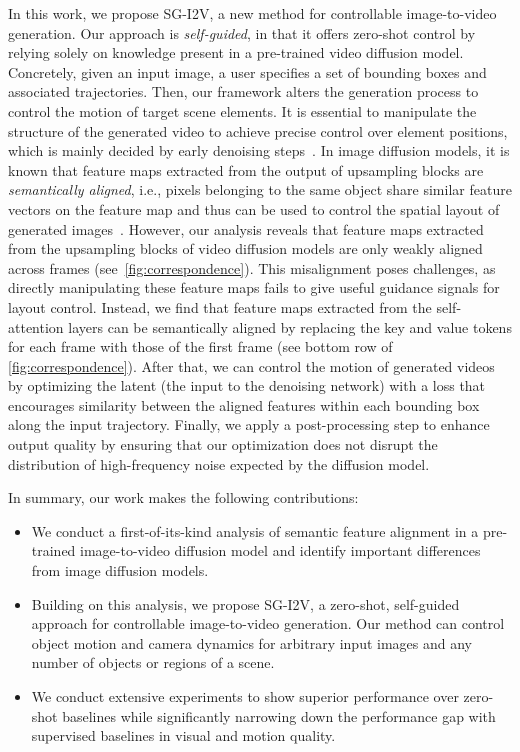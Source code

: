 \documentclass{article} \usepackage{iclr2025_conference,times}
\begin{document}
In this work, we propose SG-I2V, a new method for controllable image-to-video generation.
Our approach is \textit{self-guided}, in that it offers zero-shot control by relying solely on knowledge present in a pre-trained video diffusion model. 
Concretely, given an input image, a user specifies a set of bounding boxes and associated trajectories.
Then, our framework alters the generation process to control the motion of target scene elements.
It is essential to manipulate the structure of the
generated video to achieve precise control over element positions, which is mainly decided by early denoising steps~\citep{balaji2022ediff,DMProcessAnalyze}.
In image diffusion models, it is known that feature maps extracted from the output of upsampling blocks are \textit{semantically aligned}, i.e., pixels belonging to the same object share similar feature vectors on the feature map and thus can be used to control the spatial layout of generated images~\citep{tang2023emergent, shi2024dragdiffusion, namekata2024emerdiff, tumanyan2023plug}.
However, our analysis reveals that feature maps extracted from the upsampling blocks of video diffusion models are only weakly aligned across frames (see~\cref{fig:correspondence}).
This misalignment poses challenges, as directly manipulating these feature maps fails to give useful guidance signals for layout control. Instead, we find that feature maps extracted from the self-attention layers can be semantically aligned by replacing the key and value tokens for each frame with those of the first frame (see bottom row of \cref{fig:correspondence}).
After that, we can control the motion of generated videos by optimizing the latent (the input to the denoising network) with a loss that encourages similarity between the aligned features within each bounding box along the input trajectory. 
Finally, we apply a post-processing step to enhance output quality by ensuring that our optimization does not disrupt the distribution of high-frequency noise expected by the diffusion model.




In summary, our work makes the following contributions:
\begin{itemize}
    \item We conduct a first-of-its-kind analysis of semantic feature alignment in a pre-trained image-to-video diffusion model and identify important differences from image diffusion models.
    \item Building on this analysis, we propose SG-I2V, a zero-shot, self-guided approach for controllable image-to-video generation.
    Our method can control object motion and camera dynamics for arbitrary input images and any number of objects or regions of a scene.
    \item We conduct extensive experiments to show superior performance over zero-shot baselines while significantly narrowing down the performance gap with supervised baselines in visual and motion quality.
\end{itemize}
\end{document}
